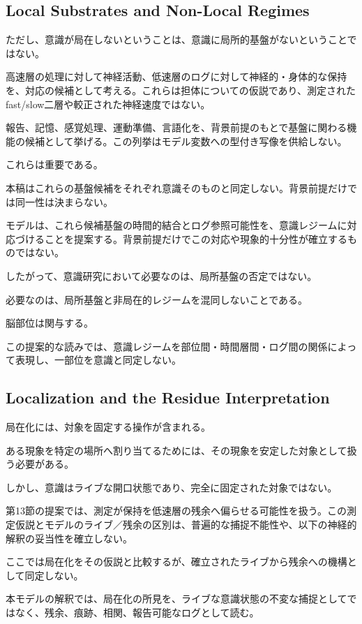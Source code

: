 \subsection{Local Substrates and Non-Local Regimes}

ただし、意識が局在しないということは、意識に局所的基盤がないということではない。

高速層の処理に対して神経活動、低速層のログに対して神経的・身体的な保持を、対応の候補として考える。これらは担体についての仮説であり、測定されたfast/slow二層や較正された神経速度ではない。

報告、記憶、感覚処理、運動準備、言語化を、背景前提のもとで基盤に関わる機能の候補として挙げる。この列挙はモデル変数への型付き写像を供給しない。

これらは重要である。

本稿はこれらの基盤候補をそれぞれ意識そのものと同定しない。背景前提だけでは同一性は決まらない。

モデルは、これら候補基盤の時間的結合とログ参照可能性を、意識レジームに対応づけることを提案する。背景前提だけでこの対応や現象的十分性が確立するものではない。

したがって、意識研究において必要なのは、局所基盤の否定ではない。

必要なのは、局所基盤と非局在的レジームを混同しないことである。

脳部位は関与する。

この提案的な読みでは、意識レジームを部位間・時間層間・ログ間の関係によって表現し、一部位を意識と同定しない。

\subsection{Localization and the Residue Interpretation}

局在化には、対象を固定する操作が含まれる。

ある現象を特定の場所へ割り当てるためには、その現象を安定した対象として扱う必要がある。

しかし、意識はライブな開口状態であり、完全に固定された対象ではない。

第13節の提案では、測定が保持を低速層の残余へ偏らせる可能性を扱う。この測定仮説とモデルのライブ／残余の区別は、普遍的な捕捉不能性や、以下の神経的解釈の妥当性を確立しない。

ここでは局在化をその仮説と比較するが、確立されたライブから残余への機構として同定しない。

本モデルの解釈では、局在化の所見を、ライブな意識状態の不変な捕捉としてではなく、残余、痕跡、相関、報告可能なログとして読む。

